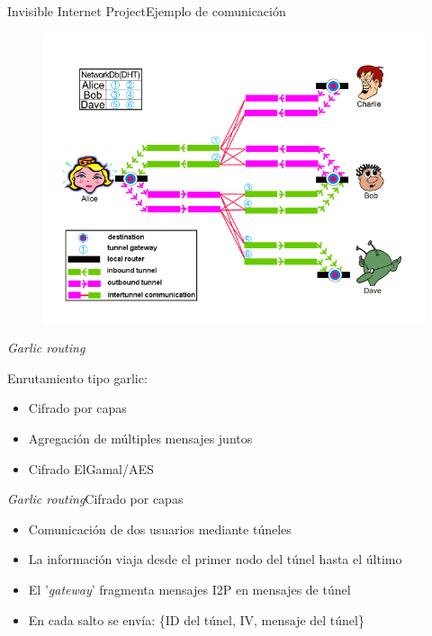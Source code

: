 \documentclass[spanish]{beamer}
\begin{document}
\begin{frame}{Invisible Internet Project}{Ejemplo de comunicación}
\begin{figure}
	\centering
	\includegraphics[width=.8\textwidth]{img/alice_bob_message}
\end{figure}
	
\end{frame}


\begin{frame}{\textit{Garlic routing}}
	
Enrutamiento tipo garlic:


\begin{itemize}
	\item Cifrado por capas
	\item Agregación de múltiples mensajes juntos
	\item Cifrado ElGamal/AES
\end{itemize}
	
\end{frame}


\begin{frame}{\textit{Garlic routing}}{Cifrado por capas}
	
 
 
 \begin{itemize}
 	\item Comunicación de dos usuarios mediante túneles
 	\item La información viaja desde el primer nodo del túnel hasta el último
 	\item El '\textit{gateway}' fragmenta mensajes I2P en mensajes de túnel
 	\item En cada salto se envía: \{ID del túnel, IV, mensaje del túnel\}
 \end{itemize}
 
 
 \end{frame}
 
\end{document}
